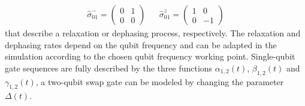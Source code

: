 %
\begin{align}
\hat{\sigma}_{01}^-  =  \left( \begin{array}{cc} 0 & 1 \\ 0 & 0 \end{array} \right) & & \hat{\sigma}_{01}^z  =  \left( \begin{array}{cc} 1 & 0 \\ 0 & -1 \end{array}\right)
\end{align}
%
that describe a relaxation or dephasing process, respectively. The relaxation and dephasing rates depend on the qubit frequency and can be adapted in the simulation according to the chosen qubit frequency working point. Single-qubit gate sequences are fully described by the three functions $\alpha_{1,2}(t)$, $\beta_{1,2}(t)$ and $\gamma_{1,2}(t)$, a two-qubit swap gate can be modeled by changing the parameter $\Delta(t)$.
